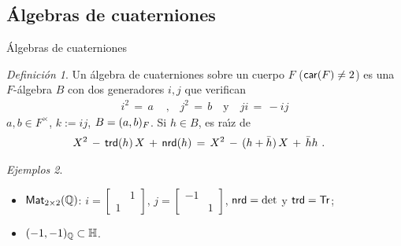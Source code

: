 \theoremstyle{remark}
\newtheorem{teoNorma}{Teorema}[section]
\newtheorem{defAlgebraDeCuaterniones}[teoNorma]{Definici\'{o}n}
\newtheorem{ejemMatrices}[teoNorma]{Ejemplos}
\newtheorem{teoClasificacion}[teoNorma]{Teorema}
\newtheorem{obsExtension}[teoNorma]{Observaci\'{o}n}
\newtheorem{defRamifica}[teoNorma]{Definici\'{o}n}
\newtheorem{defOrdenesEIdeales}[teoNorma]{Definiciones}
\newtheorem{lemaDiscriminanteReducido}[teoNorma]{Lema}
\newtheorem{obsDiscriminanteReducido}[teoNorma]{Observaci\'{o}n}
\newtheorem{defOrdenDeEichler}[teoNorma]{Definici\'{o}n}
\newtheorem{defCuaternionicas}[teoNorma]{Definici\'{o}n}
\newtheorem{obsCuaternionicas}[teoNorma]{Observaciones}
\newtheorem{teoCorrespondenciaJL}[teoNorma]{Teorema}
\newtheorem{obsCorrespondenciaJL}[teoNorma]{Observaci\'{o}n}


\subsection{\'{A}lgebras de cuaterniones}\label{subsec:preliminares}

\begin{frame}{\'{A}lgebras de cuaterniones}
	\begin{defAlgebraDeCuaterniones}\label{def:algebradecuaterniones}
		Un \'{a}lgebra de cuaterniones sobre un cuerpo $F$
		($\car(F)\not=2$) es una $F$-\'{a}lgebra $B$ con dos
		generadores $i,j$ que verifican
		\begin{align*}
			i^2\,=\,a & \text{ ,}\quad j^2\,=\,b
				\quad\text{y}\quad ji\,=\,-ij
		\end{align*}
		$a,b\in F^\times$, $k:=ij$, $B=\quatalg[F]{a,b}$. Si $h\in B$,
		es ra\'{\i}z de
		\begin{align*}
			X^2\,-\,\trd(h)\,X\,+\,\nrd(h) & \,=\,
				X^2\,-\,(h+\conj h)\,X\,+\,\conj hh
			\text{ .}
		\end{align*}
	\end{defAlgebraDeCuaterniones}
	\begin{ejemMatrices}\label{ejem:matrices}
		\begin{itemize}
			\item $\MM[2\times 2](\bb Q)$:
				\begin{math}
					i=\left[\begin{smallmatrix}
						& 1 \\ 1 &
					\end{smallmatrix}\right]
				\end{math},
				\begin{math}
					j=\left[\begin{smallmatrix}
						-1 & \\ & 1
					\end{smallmatrix}\right]
				\end{math}, $\nrd=\det$ y
				$\trd=\traza$;
			\item $\quatalg[\bb Q]{-1,-1}\subset\bb H$.
		\end{itemize}
	\end{ejemMatrices}
\end{frame}

